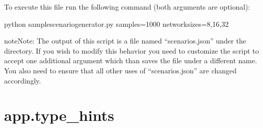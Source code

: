 \documentclass[letterpaper,10pt,english]{sphinxmanual}
\begin{document}
To execute this file run the following command (both arguments are optional):

\begin{sphinxVerbatim}[commandchars=\\\{\}]
\PYGZdl{} python sample\PYGZus{}scenario\PYGZus{}generator.py \PYGZhy{}\PYGZhy{}samples=1000 \PYGZhy{}\PYGZhy{}network\PYGZus{}sizes=8,16,32
\end{sphinxVerbatim}

\begin{sphinxadmonition}{note}{Note:}
The output of this script is a file named “scenarios.json” under the
{\hyperref[\detokenize{app:app.environment_settings.RESOURCES_ROOT}]{}} directory. If you wish
to modify this behavior you need to customize the script to accept one
additional argument which than saves the file under a different name. You
also need to ensure that all other uses of “scenarios.json” are changed
accordingly.
\end{sphinxadmonition}


\section{app.type\_hints}
\label{\detokenize{app:module-app.type_hints}}\label{\detokenize{app:app-type-hints}}

\begin{fulllineitems}
\label{\detokenize{app:app.type_hints.ClusterDict}}
\end{fulllineitems}


\begin{fulllineitems}
\label{\detokenize{app:app.type_hints.ClusterType}}
\end{fulllineitems}
\end{document}
